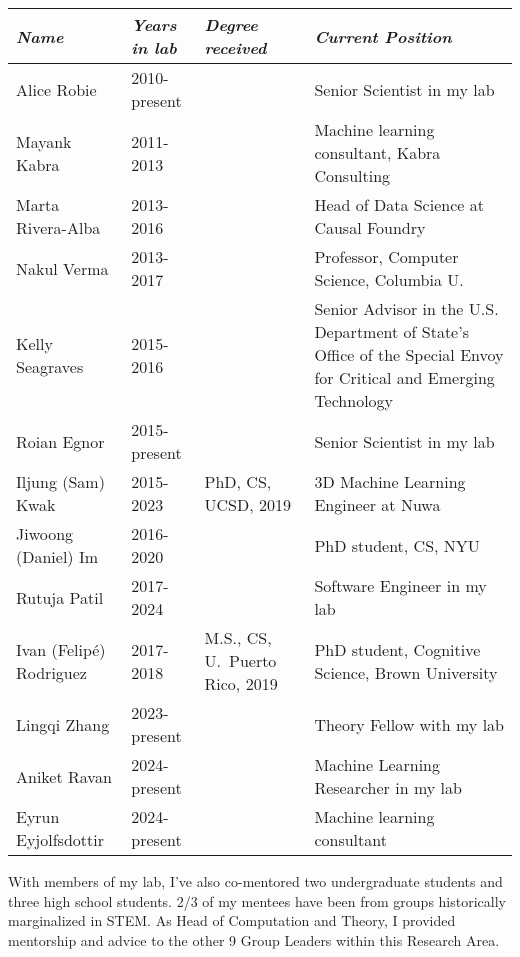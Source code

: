 \documentclass[11pt, letterpaper]{awesome-cv}
\begin{document}
\vspace{\acvSectionContentTopSkip}
\vspace{\acvSectionContentTopSkip}
\begingroup
\begin{center}
\fontsize{10pt}{1em}\bodyfont\upshape\selectfont
\setlength{\tabcolsep}{6pt}
\begin{tabular}{ll>{\raggedright\arraybackslash}p{1.5in}>{\raggedright\arraybackslash}p{2.5in}}
\hline
  {\em Name} & {\em Years in lab} & {\em Degree received} & {\em Current Position} \\\hline\hline
  Alice Robie & 2010-present & & Senior Scientist in my lab \\
  Mayank Kabra & 2011-2013 & & Machine learning consultant, Kabra Consulting \\
  Marta Rivera-Alba & 2013-2016& & Head of Data Science at Causal Foundry\\
  Nakul Verma & 2013-2017 & & Professor, Computer Science, Columbia U.\\
  Kelly Seagraves & 2015-2016 & & Senior Advisor in the U.S. Department of State’s Office of the Special Envoy for Critical and Emerging Technology \\
  Roian Egnor & 2015-present & & Senior Scientist in my lab\\
  Iljung (Sam) Kwak & 2015-2023 & PhD, CS, UCSD, 2019 & 3D Machine Learning Engineer at Nuwa\\
  Jiwoong (Daniel) Im & 2016-2020 & & PhD student, CS, NYU\\
  Rutuja Patil & 2017-2024 & & Software Engineer in my lab\\
  Ivan (Felip\'e) Rodriguez & 2017-2018 & M.S., CS, U.~Puerto Rico, 2019 & PhD student, Cognitive Science, Brown University \\
  Lingqi Zhang & 2023-present & & Theory Fellow with my lab \\
  Aniket Ravan & 2024-present & & Machine Learning Researcher in my lab \\
  Eyrun Eyjolfsdottir & 2024-present & & Machine learning consultant \\\hline
\end{tabular}
\end{center}
\endgroup
\vspace{.25cm}
With members of my lab, I've also co-mentored two undergraduate students and three high school students. 2/3 of my mentees have been from groups historically marginalized in STEM. As Head of Computation and Theory, I provided mentorship and advice to the other 9 Group Leaders within this Research Area. 
\end{document}

